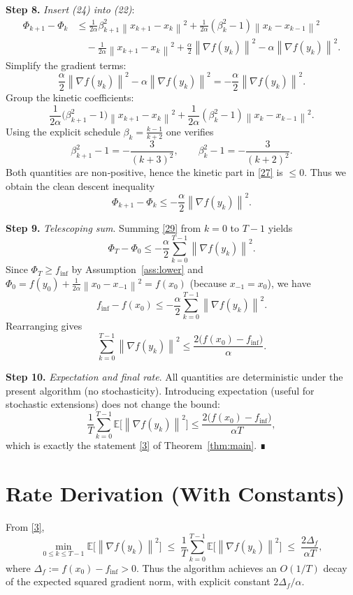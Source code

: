 \documentclass[11pt]{article}
\newcommand{\E}{\mathbb{E}}
\newcommand{\norm}[1]{\left\|#1\right\|}
\newcommand{\grad}{\nabla}
\begin{document}
\noindent\textbf{Step 8.} \emph{Insert (24) into (22)}:
\[
\begin{aligned}
\Phi_{k+1} - \Phi_k
&\le \frac{1}{2\alpha}\beta_{k+1}^{2}\norm{x_{k+1}-x_k}^{2}
   +\frac{1}{2\alpha}(\beta_k^{2}-1)\norm{x_k-x_{k-1}}^{2}\\
&\quad -\frac{1}{2\alpha}\norm{x_{k+1}-x_k}^{2}
   +\frac{\alpha}{2}\norm{\grad f(y_k)}^{2}
   -\alpha\norm{\grad f(y_k)}^{2}.
\end{aligned}
\tag{25}
\]
Simplify the gradient terms:
\[
\frac{\alpha}{2}\norm{\grad f(y_k)}^{2}-\alpha\norm{\grad f(y_k)}^{2}
= -\frac{\alpha}{2}\norm{\grad f(y_k)}^{2}.
\tag{26}
\]
Group the kinetic coefficients:
\[
\frac{1}{2\alpha}\bigl(\beta_{k+1}^{2}-1\bigr)\norm{x_{k+1}-x_k}^{2}
+ \frac{1}{2\alpha}(\beta_k^{2}-1)\norm{x_k-x_{k-1}}^{2}.
\tag{27}
\]
Using the explicit schedule $\beta_k=\frac{k-1}{k+2}$ one verifies
\[
\beta_{k+1}^{2}-1 = -\frac{3}{(k+3)^{2}},\qquad
\beta_k^{2}-1 = -\frac{3}{(k+2)^{2}} .
\tag{28}
\]
Both quantities are non‑positive, hence the kinetic part in \eqref{27} is $\le 0$.
Thus we obtain the clean descent inequality
\[
\Phi_{k+1} - \Phi_k \le -\frac{\alpha}{2}\norm{\grad f(y_k)}^{2}.
\tag{29}
\]

\noindent\textbf{Step 9.} \emph{Telescoping sum}.  
Summing \eqref{29} from $k=0$ to $T-1$ yields
\[
\Phi_T - \Phi_0 \le -\frac{\alpha}{2}\sum_{k=0}^{T-1}\norm{\grad f(y_k)}^{2}.
\tag{30}
\]
Since $\Phi_T\ge f_{\inf}$ by Assumption~\ref{ass:lower} and $\Phi_0 = f(y_0)+\frac{1}{2\alpha}\norm{x_0-x_{-1}}^{2}=f(x_0)$ (because $x_{-1}=x_0$), we have
\[
f_{\inf} - f(x_0) \le -\frac{\alpha}{2}\sum_{k=0}^{T-1}\norm{\grad f(y_k)}^{2}.
\tag{31}
\]
Rearranging gives
\[
\sum_{k=0}^{T-1}\norm{\grad f(y_k)}^{2}
\le \frac{2\bigl(f(x_0)-f_{\inf}\bigr)}{\alpha}.
\tag{32}
\]

\noindent\textbf{Step 10.} \emph{Expectation and final rate}.  
All quantities are deterministic under the present algorithm (no stochasticity). Introducing expectation (useful for stochastic extensions) does not change the bound:
\[
\frac{1}{T}\sum_{k=0}^{T-1}\E\!\bigl[\norm{\grad f(y_k)}^{2}\bigr]
\le \frac{2\bigl(f(x_0)-f_{\inf}\bigr)}{\alpha T},
\]
which is exactly the statement \eqref{3} of Theorem~\ref{thm:main}. ∎

\section*{Rate Derivation (With Constants)}
From \eqref{3},
\[
\min_{0\le k\le T-1}\E\!\bigl[\norm{\grad f(y_k)}^{2}\bigr]
\;\le\;
\frac{1}{T}\sum_{k=0}^{T-1}\E\!\bigl[\norm{\grad f(y_k)}^{2}\bigr]
\;\le\;
\frac{2\Delta_f}{\alpha T},
\]
where $\Delta_f:=f(x_0)-f_{\inf}>0$.
Thus the algorithm achieves an $O(1/T)$ decay of the expected squared gradient norm, with explicit constant $2\Delta_f/\alpha$.
\end{document}
